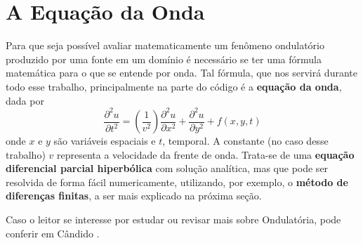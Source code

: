 \section{A Equação da Onda}

	Para que seja possível avaliar matematicamente um fenômeno ondulatório 
	produzido por uma fonte em um domínio é necessário se ter uma fórmula 
	matemática para o que se entende por onda. Tal fórmula, que nos servirá 
	durante todo esse trabalho, principalmente na parte do código é a 
	\textbf{equação da onda}, dada por 
	\begin{equation}
		\dfrac{\partial^2 u}{\partial t^2} = 
			(\dfrac{1}{v^2})
			\dfrac{\partial^2 u}{\partial x^2} + 
			\dfrac{\partial^2 u}{\partial y^2} + f(x, y, t)
	\end{equation}
	onde $x$ e $y$ são variáveis espaciais e $t$, temporal. A constante (no caso
	desse trabalho) $v$ representa a velocidade da frente de onda. Trata-se de uma 
	\textbf{equação diferencial parcial hiperbólica} com solução analítica, mas que 
	pode ser resolvida de forma fácil numericamente, utilizando, por exemplo, o 
	\textbf{método de diferenças finitas}, a ser mais explicado na próxima seção.
	
	Caso o leitor se interesse por estudar ou revisar mais sobre Ondulatória, pode 
	conferir em Cândido \cite{mfcandido2018}.
